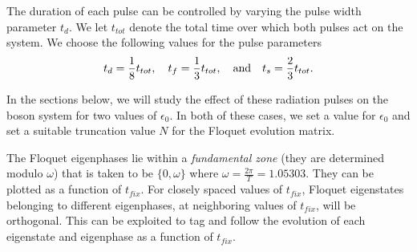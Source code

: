 The duration of each pulse can be controlled by varying the pulse width parameter  $t_d$. We let  $t_{tot}$ denote the total time over which both pulses act on the 
system. We choose the following values for the pulse parameters
%
\begin{equation}
t_d=\frac{1}{8} t_{tot},~~~t_f = \frac{1}{3} t_{tot}, ~~~{\rm and}~~~t_s = \frac{2}{3} t_{tot}.
\label{eq:pulsetimes}
\end{equation}
%

In the sections below, we will study the effect of these radiation pulses on the boson system  for two values of $\epsilon_0$. In both of these cases, we set a value for $\epsilon_0$ and set a suitable truncation value $N$ for the Floquet evolution matrix. 

The Floquet eigenphases lie within a {\it fundamental zone} (they are determined modulo $\omega$)   that is  taken to be $\lbrace 0,\omega\rbrace$ where $\omega=\frac{2\pi}{T}=1.05303$.  They can be plotted as a function of $t_{fix}$. For closely spaced values of $t_{fix}$, Floquet eigenstates belonging to different eigenphases, at neighboring values of $t_{fix}$,  will be orthogonal. This can be exploited to tag and follow the evolution of each eigenstate and eigenphase as a function of $t_{fix}$. 


